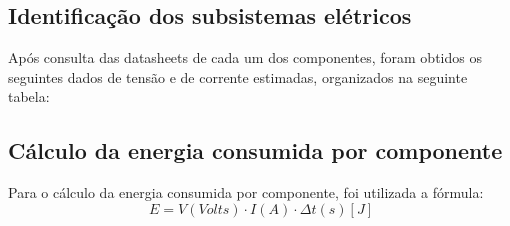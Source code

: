 \subsection{Identificação dos subsistemas elétricos}
Após consulta das datasheets de cada um dos componentes, foram obtidos os seguintes dados de tensão e de corrente estimadas, organizados na seguinte tabela:

\begin{table}[h]
\centering
\renewcommand{\arraystretch}{1.3} %
\caption{Dimensionamento de Tensão e Corrente dos Componentes do Robô}
\label{tab:dimensionamento_energia}
\end{table}

\subsection{Cálculo da energia consumida por componente}
Para o cálculo da energia consumida por componente, foi utilizada a fórmula:
\[
    \ E = V (Volts) \cdot I (A) \cdot \Delta t (s)      [J]
\]

